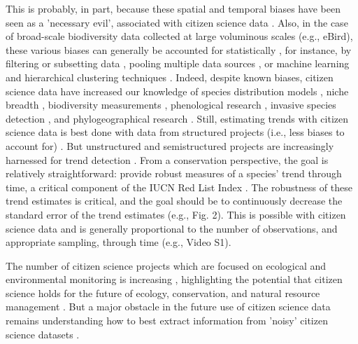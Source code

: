 \documentclass[9pt,twocolumn,twoside,lineno]{pnas-new}
\begin{document}
This is probably, in part, because these spatial and temporal biases have been seen as a 'necessary evil', associated with citizen science data \cite{parrish2018exposing}. Also, in the case of broad-scale biodiversity data collected at large voluminous scales (e.g., eBird), these various biases can generally be accounted for statistically \cite{isaac2014statistics, robinson2018correcting}, for instance, by filtering or subsetting data \cite{wiggins2011conservation}, pooling multiple data sources \cite{fithian2015bias}, or machine learning and hierarchical clustering techniques \cite{hochachka2012data, kelling2015taking}. Indeed, despite known biases, citizen science data have increased our knowledge of species distribution models \cite{bradsworth2017species, van2013opportunistic}, niche breadth \cite{tiago2017using}, biodiversity measurements \cite{stuart2017assessing, pocock2018vision}, phenological research \cite{la2014role, supp2015citizen}, invasive species detection \cite{pocock2017citizen, grason2018citizen}, and phylogeographical research \cite{bahls2014new, drury2019continent}. Still, estimating trends with citizen science data is best done with data from structured projects (i.e., less biases to account for) \cite{fox2011new}. But unstructured and semistructured projects are increasingly harnessed for trend detection \cite{walker2017using, kery2009trend, kery2010site, horns2018using, van2013occupancy, pagel2014quantifying}. From a conservation perspective, the goal is relatively straightforward: provide robust measures of a species' trend through time, a critical component of the IUCN Red List Index \cite{baillie2008toward}. The robustness of these trend estimates is critical, and the goal should be to continuously decrease the standard error of the trend estimates (e.g., Fig. 2). This is possible with citizen science data \cite{kery2010site, horns2018using, van2013occupancy, pagel2014quantifying} and is generally proportional to the number of observations, and appropriate sampling, through time (e.g., Video S1).

The number of citizen science projects which are focused on ecological and environmental monitoring is increasing \cite{pocock2017diversity, theobald2015global}, highlighting the potential that citizen science holds for the future of ecology, conservation, and natural resource management \cite{pocock2018vision, silvertown2009new, soroye2018opportunistic, mckinley2017citizen}. But a major obstacle in the future use of citizen science data remains understanding how to best extract information from 'noisy' citizen science datasets \cite{parrish2018exposing}.
\end{document}
